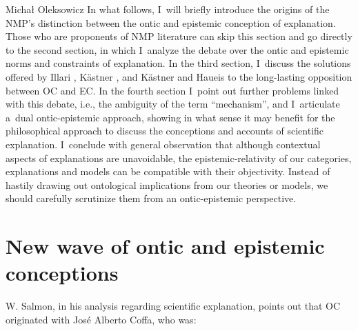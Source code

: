 \begin{artengenv}{Michał Oleksowicz}
In what follows, I~will briefly introduce the origins of the NMP's distinction between the ontic and epistemic conception of explanation. Those who are proponents of NMP literature can skip this section and go directly to the second section, in which I~analyze the debate over the ontic and epistemic norms and constraints of explanation. In the third section, I~discuss the solutions offered by Illari
\parencite*[][]{illari_mechanistic_2013}, %
 Kästner 
\parencite*[][]{kastner_integrating_2018}, %
 and Kästner and Haueis 
\parencite*[][]{kastner_discovering_2021} %
 to the long-lasting opposition between OC and EC. In the fourth section I~point out further problems linked with this debate, i.e., the ambiguity of the term ``mechanism'', and I~articulate a~dual ontic-epistemic approach, showing in what sense it may benefit for the philosophical approach to discuss the conceptions and accounts of scientific explanation. I~conclude with general observation that although contextual aspects of explanations are unavoidable, the epistemic-relativity of our categories, explanations and models can be compatible with their objectivity. Instead of hastily drawing out ontological implications from our theories or models, we should carefully scrutinize them from an ontic-epistemic perspective.

\section{New wave of ontic and epistemic conceptions}
W. Salmon, in his analysis regarding scientific explanation, points out that OC originated with José Alberto Coffa, who was:



\end{artengenv}
